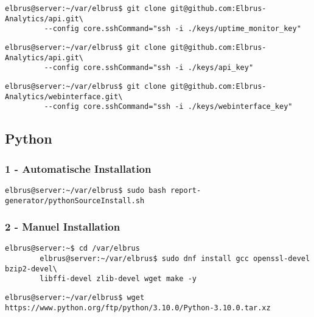 \documentclass{article}
\begin{document}
	\begin{lstlisting}[caption={Clonen der Uptime-Monitor Software.}]
		elbrus@server:~/var/elbrus$ git clone git@github.com:Elbrus-Analytics/api.git\
		 --config core.sshCommand="ssh -i ./keys/uptime_monitor_key"
	\end{lstlisting}
	
	\begin{lstlisting}[caption={Clonen der API Software.}]
		elbrus@server:~/var/elbrus$ git clone git@github.com:Elbrus-Analytics/api.git\
		 --config core.sshCommand="ssh -i ./keys/api_key"
	\end{lstlisting}

	\begin{lstlisting}[caption={Clonen der Packet-Importer Software}]
		elbrus@server:~/var/elbrus$ git clone git@github.com:Elbrus-Analytics/webinterface.git\
		 --config core.sshCommand="ssh -i ./keys/webinterface_key"
	\end{lstlisting}

	\newpage
	\subsection{Python}
	\lstset{style=commands}
	\subsubsection{1 - Automatische Installation}

	\begin{lstlisting}[caption={Ausführen des 'pythonSourceInstall.sh' Scripts.}]
		elbrus@server:~/var/elbrus$ sudo bash report-generator/pythonSourceInstall.sh
	\end{lstlisting}
	
	\subsubsection{2 - Manuel Installation}
	\begin{lstlisting}[caption={Installieren von benötigten Packeten und Abhängigkeiten.}]
		elbrus@server:~$ cd /var/elbrus
		elbrus@server:~/var/elbrus$ sudo dnf install gcc openssl-devel bzip2-devel\
		libffi-devel zlib-devel wget make -y
	\end{lstlisting}
	
	\begin{lstlisting}[caption={Herunterladen der Source Datei.}]
		elbrus@server:~/var/elbrus$ wget https://www.python.org/ftp/python/3.10.0/Python-3.10.0.tar.xz
	\end{lstlisting}
	
\end{document}
